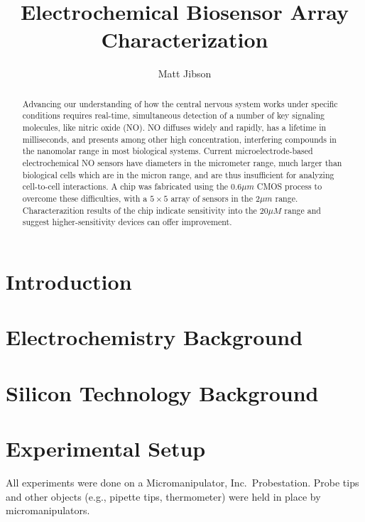 \documentclass[twocolumn]{article}
\begin{document}
\title{Electrochemical Biosensor Array Characterization}
\author{Matt Jibson}

\maketitle{}

\begin{abstract}

Advancing our understanding of how the central nervous system works under specific conditions requires real-time, simultaneous detection of a number of key signaling molecules, like nitric oxide (NO). NO diffuses widely and rapidly, has a lifetime in milliseconds, and presents among other high concentration, interfering compounds in the nanomolar range in most biological systems. Current microelectrode-based electrochemical NO sensors have diameters in the micrometer range, much larger than biological cells which are in the micron range, and are thus insufficient for analyzing cell-to-cell interactions. A chip was fabricated using the $0.6\mu m$ CMOS process to overcome these difficulties, with a $5 \times 5$ array of sensors in the 2$\mu m$ range. Characterazition results of the chip indicate sensitivity into the 20$\mu M$ range and suggest higher-sensitivity devices can offer improvement.

\end{abstract}

\section{Introduction}

\section{Electrochemistry Background}

\section{Silicon Technology Background}

\section{Experimental Setup}

All experiments were done on a Micromanipulator, Inc.\ Probestation. Probe tips and other objects (e.g., pipette tips, thermometer) were held in place by micromanipulators.
\end{document}
